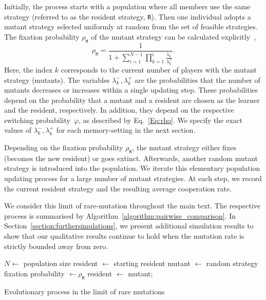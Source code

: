 \documentclass[11pt]{article}
\def\resident{\texttt{R}}
\def\mutant{\texttt{M}}
\theoremstyle{plainCl1}
\theoremstyle{plainCl2}
\begin{document}

Initially, the process starts with a population where all members use the same strategy (referred to as the resident strategy, \resident). 
Then one individual adopts a mutant strategy selected uniformly at random from the set of feasible strategies.
The fixation probability \(\rho_{\mutant}\) of the mutant strategy can be calculated explicitly~\citep{nowak:Nature:2004},
\begin{equation}\label{eq:fixation_probability}
    \rho_{\mutant} = \frac{1}{1+\sum\limits_{i=1}^{N-1}\prod\limits_{k=1}^i \frac{\lambda^-_k}{\lambda^+_k}}.
\end{equation}
Here, the index $k$ corresponds to the current number of players with the mutant strategy (mutants). 
The variables \(\lambda^-_k, \lambda^+_k\) are the probabilities that the number of mutants decreases or increases within a single updating step. 
These probabilities depend on the probability that a mutant and a resident are chosen as the learner and the resident, respectively. 
In addition, they depend on the respective switching probability~$\varphi$, as described by Eq.~\eqref{Eq:rho}. 
We specify the exact values of  \(\lambda^-_k, \lambda^+_k\) for each memory-setting in the next section. 

Depending on the fixation probability \(\rho_{\mutant}\), the mutant strategy either fixes (becomes the new resident) or goes extinct. 
Afterwards, another random mutant strategy is introduced into the population. 
We iterate this elementary population updating process for a large number of mutant strategies. 
At each step, we record the current resident strategy and the resulting average cooperation rate. 

We consider this limit of rare-mutation throughout the main text. 
The respective process is summarised by Algorithm~\ref{algorithm:pairwise_comparison}.
In Section~\ref{section:furthersimulations}, we present additional simulation results to show that our qualitative results continue to hold when the mutation rate is strictly bounded away from zero. 


\begin{algorithm}[t]
  \SetAlgoLined
  $N \leftarrow$ population size\;
  resident $\leftarrow$ starting resident\;
   {mutant $\leftarrow$ random strategy\;
   fixation probability $\leftarrow \rho_\mutant $\;
   \If{$\rho_{\mutant} >$ random: $i \rightarrow [0,1]$}
   {resident $\leftarrow$ mutant;}}
   \caption{Evolutionary process in the limit of rare mutations}\label{algorithm:pairwise_comparison}
\end{algorithm}
\end{document}
